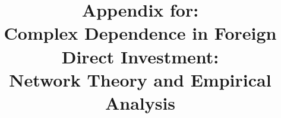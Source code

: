 \documentclass[reqno,onecolumn,letterpaper,12pt]{article}
\begin{document}
\title{{\bf Appendix for:} \\Complex Dependence in Foreign Direct Investment: \\Network Theory and Empirical Analysis} %
\date{}
\maketitle
\end{document}
